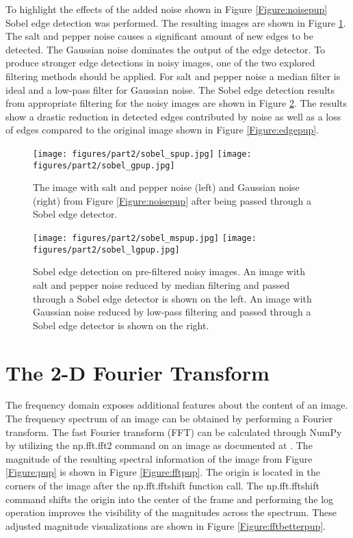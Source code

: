 \documentclass{article}
\begin{document}
To highlight the effects of the added noise shown in Figure \ref{Figure:noisepup} Sobel edge detection was performed. The resulting images are shown in Figure \ref{Figure:sobelnoisepup}. The salt and pepper noise causes a significant amount of new edges to be detected. The Gaussian noise dominates the output of the edge detector. To produce stronger edge detections in noisy images, one of the two explored filtering methods should be applied. For salt and pepper noise a median filter is ideal and a low-pass filter for Gaussian noise. The Sobel edge detection results from appropriate filtering for the noisy images are shown in Figure \ref{Figure:sobeldenoisepup}. The results show a drastic reduction in detected edges contributed by noise as well as a loss of edges compared to the original image shown in Figure \ref{Figure:edgepup}.

\begin{figure}[!ht]
  \centering
  \texttt{[image: figures/part2/sobel\_spup.jpg]}
  \texttt{[image: figures/part2/sobel\_gpup.jpg]}
  \caption{The image with salt and pepper noise (left) and Gaussian noise (right) from Figure \ref{Figure:noisepup} after being passed through a Sobel edge detector.}
  \label{Figure:sobelnoisepup}
\end{figure}

\begin{figure}[!ht]
  \centering
  \texttt{[image: figures/part2/sobel\_mspup.jpg]}
  \texttt{[image: figures/part2/sobel\_lgpup.jpg]}
  \caption{Sobel edge detection on pre-filtered noisy images. An image with salt and pepper noise reduced by median filtering and passed through a Sobel edge detector is shown on the left. An image with Gaussian noise reduced by low-pass filtering and passed through a Sobel edge detector is shown on the right.}
  \label{Figure:sobeldenoisepup}
\end{figure}

\section{The 2-D Fourier Transform}
The frequency domain exposes additional features about the content of an image. The frequency spectrum of an image can be obtained by performing a Fourier transform. The fast Fourier transform (FFT) can be calculated through NumPy by utilizing the np.fft.fft2 command on an image as documented at \cite{opencvfft}. The magnitude of the resulting spectral information of the image from Figure \ref{Figure:pup} is shown in Figure \ref{Figure:fftpup}. The origin is located in the corners of the image after the np.fft.fftshift function call. The np.fft.fftshift command shifts the origin into the center of the frame and performing the log operation improves the visibility of the magnitudes across the spectrum. These adjusted magnitude visualizations are shown in Figure \ref{Figure:fftbetterpup}.
\end{document}
